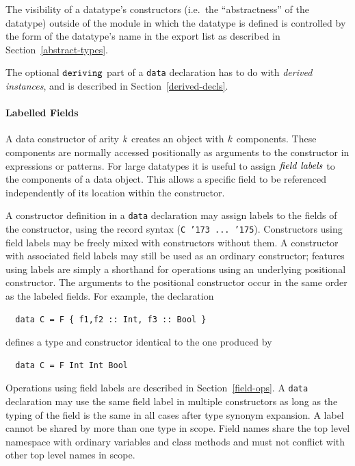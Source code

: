 The visibility of a datatype's constructors (i.e.~the ``abstractness''
of the datatype) outside of the module in which the datatype is
defined is controlled by the form of the datatype's name in the export
list as described in Section~\ref{abstract-types}.

The optional \mbox{$\it \makebox{\tt deriving}$} part of a \mbox{\tt data} declaration has to do
with {\em derived instances}, and is described in
Section~\ref{derived-decls}.

\paragraph{Labelled Fields}
\label{field-labels}
A data constructor of arity \mbox{$\it k$} creates an object with \mbox{$\it k$} components.
These components are normally accessed positionally as arguments to the
constructor in expressions or patterns.  For large datatypes it is
useful to assign \mbox{$\it field\ labels$} to the components of a data object.
This allows a specific field to be referenced independently of its
location within the constructor.

A constructor definition in a \mbox{\tt data} declaration may assign labels to the
fields of the constructor, using the record syntax (\mbox{\tt C\ {\char'173}\ ...\ {\char'175}}).
Constructors using field labels may be freely mixed with constructors
without them. 
A constructor with associated field labels may still be used as an
ordinary constructor; features using labels are
simply a shorthand for operations using an underlying positional
constructor.  The arguments to the positional constructor occur in the
same order as the labeled fields.  For example, the declaration
\bprog
{\small\begin{verbatim}
  data C = F { f1,f2 :: Int, f3 :: Bool }
\end{verbatim}}
\eprog
defines a type and constructor identical to the one produced by
\bprog
{\small\begin{verbatim}
  data C = F Int Int Bool
\end{verbatim}}
\eprog
Operations using field labels are described in Section~\ref{field-ops}.
A \mbox{\tt data} declaration may use the same field label in multiple
constructors as long as the typing of the field is the same in all
cases after type synonym expansion.  A label cannot be shared by
more than one type in scope.  Field names share the top level namespace
with ordinary variables and class methods and must not conflict with
other top level names in scope.

